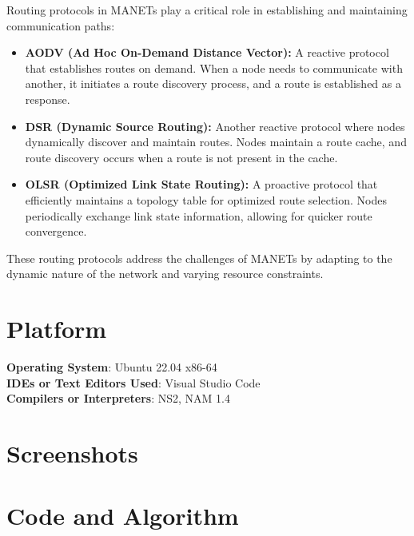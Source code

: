 \documentclass[11pt]{article}
\begin{document}
Routing protocols in MANETs play a critical role in establishing and maintaining communication paths:

\begin{itemize}
    \item \textbf{AODV (Ad Hoc On-Demand Distance Vector):} A reactive protocol that establishes routes on demand. When a node needs to communicate with another, it initiates a route discovery process, and a route is established as a response.
    \item \textbf{DSR (Dynamic Source Routing):} Another reactive protocol where nodes dynamically discover and maintain routes. Nodes maintain a route cache, and route discovery occurs when a route is not present in the cache.
    \item \textbf{OLSR (Optimized Link State Routing):} A proactive protocol that efficiently maintains a topology table for optimized route selection. Nodes periodically exchange link state information, allowing for quicker route convergence.
\end{itemize}

These routing protocols address the challenges of MANETs by adapting to the dynamic nature of the network and varying resource constraints.




\section{Platform}
\textbf{Operating System}: Ubuntu 22.04 x86-64 \\
\textbf{IDEs or Text Editors Used}: Visual Studio Code\\
\textbf{Compilers or Interpreters}: NS2, NAM 1.4\\

\section{Screenshots}


\section{Code and Algorithm}
\end{document}
